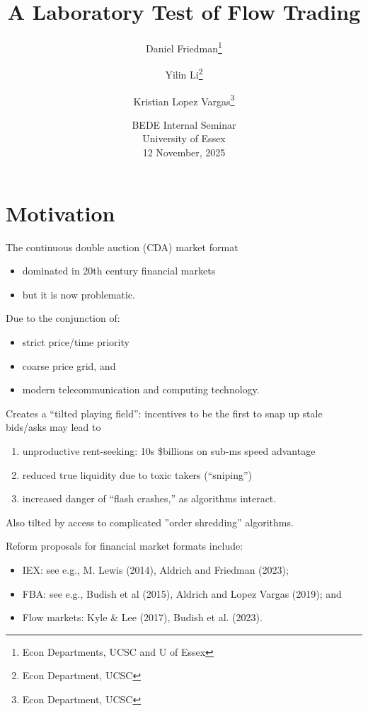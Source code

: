 \documentclass[10pt]{beamer}
\title[FlowMkts]{A Laboratory Test of Flow Trading}
\author[DF]{Daniel Friedman\thanks{Econ Departments, UCSC and U of Essex}
\and Yilin Li\thanks{Econ Department, UCSC}
\and Kristian Lopez Vargas\thanks{Econ Department, UCSC}
}
\begin{document}
\date[Essex]{BEDE Internal Seminar\\
University of Essex\\
12 November, 2025
} 

\frame{\titlepage} 


\tableofcontents

\section{Motivation}
\begin{frame}{
The continuous double auction (CDA) market format}
\begin{itemize}
\item dominated in 20th century financial markets 
\item but it is now problematic.  \pause
\end{itemize}
Due to the conjunction of:
\begin{itemize}
\item strict price/time priority  
\item coarse price grid, and 
\item modern telecommunication and computing technology.

 \end{itemize} 
 \end{frame}

\begin{frame}{Creates a ``tilted playing field'': }
incentives to be the first to snap up stale bids/asks may lead to
 \pause
\begin{enumerate}
\item unproductive rent-seeking: 10s \$billions on sub-ms speed advantage \pause
\item reduced true liquidity due to toxic takers (``sniping'') \pause
\item increased danger of ``flash crashes,'' as algorithms interact. \pause
  \end{enumerate}
Also tilted by access to complicated ''order shredding'' algorithms.
\end{frame}

\begin{frame}{Reform proposals}
for financial market formats include:
    \begin{itemize}
\item IEX: see e.g., M. Lewis (2014), Aldrich and Friedman (2023); \pause
\item FBA: see e.g., Budish et al (2015), Aldrich and Lopez Vargas (2019); and \pause
\item Flow markets:  Kyle \& Lee (2017), Budish et al. (2023).
\end{itemize}
\end{frame}
\end{document}
